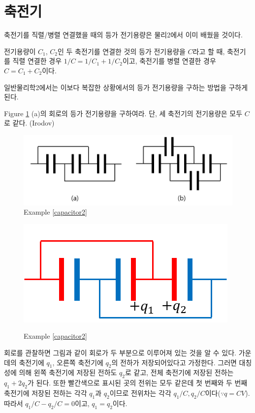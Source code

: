 \section{축전기}
축전기를 직렬/병렬 연결했을 때의 등가 전기용량은 물리2에서 이미 배웠을 것이다.
\begin{remark}
전기용량이 $C_1$, $C_2$인 두 축전기를 연결한 것의 등가 전기용량을 $C$라고 할 때, 축전기를 직렬 연결한 경우 $1/C = 1/C_1 +1/C_2$이고, 축전기를 병렬 연결한 경우 $C=C_1+C_2$이다.
\end{remark}
일반물리학2에서는 이보다 복잡한 상황에서의 등가 전기용량을 구하는 방법을 구하게 된다. 
\begin{example}\label{capacitor2}
Figure \ref{fig:capacitor2} (a)의 회로의 등가 전기용량을 구하여라. 단, 세 축전기의 전기용량은 모두 $C$로 같다. (Irodov)
\end{example}
\begin{figure}[h]
\centering\includegraphics[scale=0.4]{Pictures/capacitor2.PNG}
\caption{Example \ref{capacitor2}}
\label{fig:capacitor2}
\end{figure}
\begin{figure}[h]
\centering\includegraphics[scale=0.4]{Pictures/capacitor2-1.PNG}
\label{fig:cap2-1}
\caption{Example \ref{capacitor2}}
\end{figure}
회로를 관찰하면 그림과 같이 회로가 두 부분으로 이루어져 있는 것을 알 수 있다. 가운데의 축전기에 $q_1$, 오른쪽 축전기에 $q_2$의 전하가 저장되어있다고 가정한다. 그러면 대칭성에 의해 왼쪽 축전기에 저장된 전하도 $q_2$로 같고, 전체 축전기에 저장된 전하는 $q_1+2q_2$가 된다. 또한 빨간색으로 표시된 곳의 전위는 모두 같은데 첫 번째와 두 번째 축전기에 저장된 전하는 각각 $q_1$과 $q_2$이므로 전위차는 각각 $q_1/C, q_2/C$이다($\because q=CV$). 따라서  $q_1/C-q_2/C=0$이고, $q_1=q_2$이다.\\

